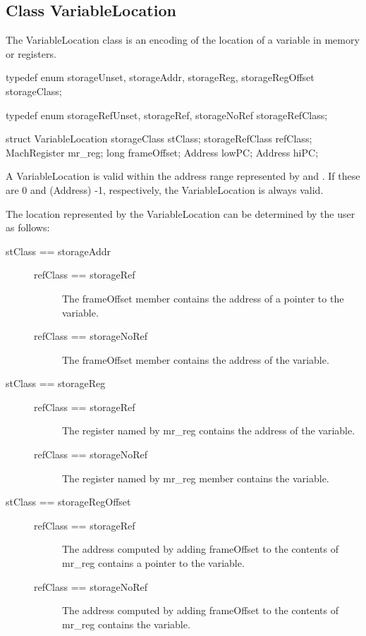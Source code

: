 \subsection{Class VariableLocation}\label{VariableLocation}

The VariableLocation class is an encoding of the location of a variable in memory or registers. 

\begin{apient}
typedef enum {
   storageUnset,
   storageAddr,
   storageReg,
   storageRegOffset
} storageClass;
	
typedef enum {
   storageRefUnset,
   storageRef,
   storageNoRef
} storageRefClass;

struct VariableLocation  {
    storageClass stClass;
    storageRefClass refClass;
    MachRegister mr_reg;
    long frameOffset;
    Address lowPC;
	Address hiPC;
}
\end{apient}

A VariableLocation is valid within the address range represented by  and . If these are 0 and (Address) -1, respectively, the VariableLocation is always valid. 

The location represented by the VariableLocation can be determined by the user as follows:

\begin{description}
	\item[stClass == storageAddr]
	\begin{description}
		\item[refClass == storageRef] The frameOffset member contains the address of a pointer to the variable. 
		\item[refClass == storageNoRef] The frameOffset member contains the address of the variable. 
	\end{description}
	\item[stClass == storageReg]
	\begin{description}
		\item[refClass == storageRef] The register named by mr\_reg  contains the address of the variable. 
		\item[refClass == storageNoRef] The register named by mr\_reg member contains the variable. 
	\end{description}
	\item[stClass == storageRegOffset] 
	\begin{description}
		\item[refClass == storageRef] The address computed by adding frameOffset to the contents of mr\_reg contains a pointer to the variable. 
		\item[refClass == storageNoRef] The address computed by adding frameOffset to the contents of mr\_reg contains the variable.  
	\end{description}
\end{description}
